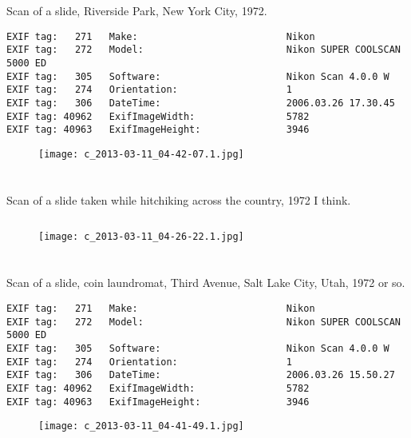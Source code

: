 \section{\protect{}}
\noindent Scan of a slide, Riverside Park, New York City, 1972.
\noindent
\begin{lstlisting}
EXIF tag:   271   Make:                          Nikon
EXIF tag:   272   Model:                         Nikon SUPER COOLSCAN 5000 ED
EXIF tag:   305   Software:                      Nikon Scan 4.0.0 W
EXIF tag:   274   Orientation:                   1
EXIF tag:   306   DateTime:                      2006.03.26 17.30.45
EXIF tag: 40962   ExifImageWidth:                5782
EXIF tag: 40963   ExifImageHeight:               3946

\end{lstlisting}
\clearpage
\begin{figure}
\raggedleft
\texttt{[image: c\_2013-03-11\_04-42-07.1.jpg]}
\end{figure}


\clearpage
\section{\protect{}}
\noindent Scan of a slide taken while hitchiking across the country, 1972 I think.
\noindent
\begin{lstlisting}

\end{lstlisting}
\clearpage
\begin{figure}
\raggedleft
\texttt{[image: c\_2013-03-11\_04-26-22.1.jpg]}
\end{figure}


\clearpage
\section{\protect{}}
\noindent Scan of a slide, coin laundromat, Third Avenue, Salt Lake City, Utah, 1972 or so.
\noindent
\begin{lstlisting}
EXIF tag:   271   Make:                          Nikon
EXIF tag:   272   Model:                         Nikon SUPER COOLSCAN 5000 ED
EXIF tag:   305   Software:                      Nikon Scan 4.0.0 W
EXIF tag:   274   Orientation:                   1
EXIF tag:   306   DateTime:                      2006.03.26 15.50.27
EXIF tag: 40962   ExifImageWidth:                5782
EXIF tag: 40963   ExifImageHeight:               3946

\end{lstlisting}
\clearpage
\begin{figure}
\raggedleft
\texttt{[image: c\_2013-03-11\_04-41-49.1.jpg]}
\end{figure}


